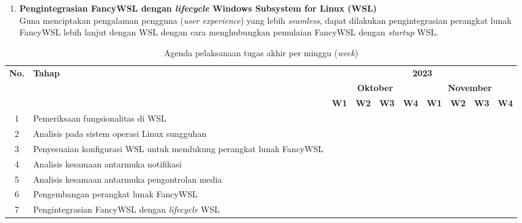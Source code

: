 \begin{enumerate}
    \item \textbf{Pengintegrasian FancyWSL dengan \textit{lifecycle} Windows Subsystem for Linux (WSL)}\\
    Guna menciptakan pengalaman pengguna (\textit{user experience}) yang lebih \textit{seamless}, dapat dilakukan pengintegrasian perangkat lunak FancyWSL lebih lanjut dengan WSL dengan cara menghubungkan pemulaian FancyWSL dengan \textit{startup} WSL.
\end{enumerate}

\begin{table}
    \centering
    \begin{tabular}{|c|p{4cm}|c|c|c|c|c|c|c|c|} \hline 
        \multirow{3}{*}{\textbf{No.}} & \multirow{3}{*}{\textbf{Tahap}} & \multicolumn{8}{c|}{\textbf{2023}}\\ \cline{3-10} 
        & & \multicolumn{4}{c|}{\textbf{Oktober}} & \multicolumn{4}{c|}{\textbf{November}}\\ \cline{3-10} 
        & & \textbf{W1} & \textbf{W2} & \textbf{W3} & \textbf{W4} & \textbf{W1} & \textbf{W2} & \textbf{W3} & \textbf{W4}\\ \hline 
        1 & Pemeriksaan fungsionalitas di WSL & \cellcolor{black} &  &  &  &  &  &  & \\ \hline 
        2 & Analisis pada sistem operasi Linux sungguhan & \cellcolor{black} & \cellcolor{black} &  &  &  &  &  & \\ \hline 
        3 & Penyesuaian konfigurasi WSL untuk mendukung perangkat lunak FancyWSL &  &  & \cellcolor{black} & \cellcolor{black} &  &  &  & \\ \hline 
        4 & Analisis kesamaan antarmuka notifikasi &  &  & \cellcolor{black} & \cellcolor{black} & \cellcolor{black} & &  & \\ \hline 
        5 & Analisis kesamaan antarmuka pengontrolan media &  &  & \cellcolor{black} & \cellcolor{black} & \cellcolor{black} &  &  & \\ \hline 
        6 & Pengembangan perangkat lunak FancyWSL &  &  &  &  & \cellcolor{black} & \cellcolor{black} & \cellcolor{black} & \cellcolor{black}\\ \hline 
        7 & Pengintegrasian FancyWSL dengan \textit{lifecycle} WSL &  &  &  &  &  &  &  & \cellcolor{black}\\ \hline 
    \end{tabular}
    \caption{Agenda pelaksanaan tugas akhir per minggu (\textit{week})}
    \label{tabel-agenda-pelaksanaan}
\end{table}

